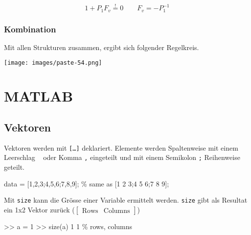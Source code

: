 \documentclass[
  10pt,
  a4paper,
  twocolumn]{article}
\newenvironment{Shaded}{}{}
\newcommand{\CommentTok}[1]{\textcolor[rgb]{0.42,0.45,0.49}{#1}}
\newcommand{\FloatTok}[1]{\textcolor[rgb]{0.00,0.36,0.77}{#1}}
\newcommand{\NormalTok}[1]{\textcolor[rgb]{0.14,0.16,0.18}{#1}}
\newcommand{\OperatorTok}[1]{\textcolor[rgb]{0.14,0.16,0.18}{#1}}
\newcommand{\VariableTok}[1]{\textcolor[rgb]{0.89,0.38,0.04}{#1}}
\numberwithin{equation}{section}
\begin{document}
\[
1+P_1F_v \stackrel{!}{=}0\qquad F_v = -P_1^{-1}
\]

\subsubsection{Kombination}\label{kombination}

Mit allen Strukturen zusammen, ergibt sich folgender Regelkreis.

\texttt{[image: images/paste-54.png]}

\section{MATLAB}\label{matlab}

\subsection{Vektoren}\label{vektoren}

Vektoren werden mit \texttt{{[}…{]}} deklariert. Elemente werden
Spaltenweise mit einem Leerschlag
\texttt{\textquotesingle{}\ \textquotesingle{}} oder Komma \texttt{,}
eingeteilt und mit einem Semikolon \texttt{;} Reihenweise geteilt.

\begin{Shaded}
\begin{Highlighting}[]
\VariableTok{data} \OperatorTok{=}\NormalTok{ [}\FloatTok{1}\OperatorTok{,}\FloatTok{2}\OperatorTok{,}\FloatTok{3}\OperatorTok{;}\FloatTok{4}\OperatorTok{,}\FloatTok{5}\OperatorTok{,}\FloatTok{6}\OperatorTok{;}\FloatTok{7}\OperatorTok{,}\FloatTok{8}\OperatorTok{,}\FloatTok{9}\NormalTok{]}\OperatorTok{;} \CommentTok{\% same as [1 2 3;4 5 6;7 8 9];}
\end{Highlighting}
\end{Shaded}

\begin{tcolorbox}[enhanced jigsaw, coltitle=black, colback=white, breakable, colframe=quarto-callout-note-color-frame, rightrule=.15mm, left=2mm, opacityback=0, leftrule=.75mm, toptitle=1mm, colbacktitle=quarto-callout-note-color!10!white, bottomtitle=1mm, arc=.35mm, bottomrule=.15mm, title=\textcolor{quarto-callout-note-color}{\faInfo}\hspace{0.5em}{Grösse \texttt{size}}, titlerule=0mm, toprule=.15mm, opacitybacktitle=0.6]

Mit \texttt{size} kann die Grösse einer Variable ermittelt werden.
\texttt{size} gibt als Resultat ein 1x2 Vektor zurück
(\(\begin{bmatrix}\text{Rows} & \text{Columns}\end{bmatrix}\))

\begin{Shaded}
\begin{Highlighting}[]
\OperatorTok{\textgreater{}\textgreater{}} \VariableTok{a} \OperatorTok{=} \FloatTok{1}
\OperatorTok{\textgreater{}\textgreater{}} \VariableTok{size}\NormalTok{(}\VariableTok{a}\NormalTok{)}
     \FloatTok{1}     \FloatTok{1}  \CommentTok{\% rows, columns}
\end{Highlighting}
\end{Shaded}

\end{tcolorbox}
\end{document}
